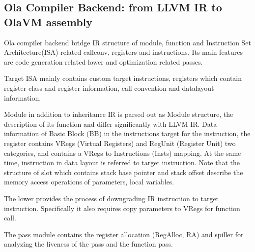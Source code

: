 \subsection{Ola Compiler Backend: from LLVM IR to OlaVM assembly}

Ola compiler backend bridge IR structure of module, function and Instruction Set Architecture(ISA) related callconv, registers and instructions.
Its main features are code generation related lower and optimization related passes.

Target ISA mainly contains custom target instructions, registers which contain register class and register information, call convention and datalayout information.

Module in addition to inheritance IR is parsed out as Module structure, the description of its function and differ significantly with LLVM IR.
Data information of Basic Block (BB) in the instructions target for the instruction, the register contains VRegs (Virtual Registers) and RegUnit (Register Unit) two categories, and contains a VRegs to Instructions (Insts) mapping.
At the same time, instruction in data layout is referred to target instruction. Note that the structure of slot which contains stack base pointer and stack offset describe the memory access operations of parameters, local variables.

The lower provides the process of downgrading IR instruction to target instruction. Specifically it also requires copy parameters to VRegs for function call.

The pass module contains the register allocation (RegAlloc, RA) and spiller for analyzing the liveness of the pass and the function pass.











